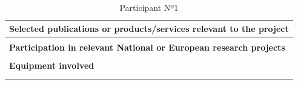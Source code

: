 \begin{longtable}[H]{|p{0.7cm}|p{4cm}|p{7cm}|p{1.3cm}|}
	\multicolumn{4}{|p{13cm}|}{\textbf{Selected publications or products/services relevant to the project}}  \\ \hline
	
	\multicolumn{4}{|p{13cm}|}{}  \\ \hline
	
	\multicolumn{4}{|p{13cm}|}{\textbf{Participation in relevant National or European research projects}}  \\ \hline
	
	\multicolumn{4}{|p{13cm}|}{}  \\ \hline
	
	\multicolumn{4}{|p{13cm}|}{\textbf{Equipment involved}}  \\ \hline
	
	\multicolumn{4}{|p{13cm}|}{}  \\ \hline
	\caption{Participant Nº1}
\end{longtable}

